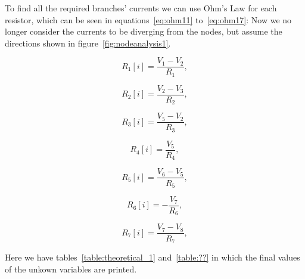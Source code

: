 To find all the required branches' currents we can use Ohm's Law for each resistor, which can be seen in equations~\ref{eq:ohm11} to~\ref{eq:ohm17}: Now we no longer consider the currents to be diverging from the nodes, but assume the directions shown in figure~\ref{fig:nodeanalysis1}.


\begin{equation}
  R_1[i] = \frac{V_1 - V_2}{R_1},
  \label{eq:ohm11}
\end{equation}

\begin{equation}
  R_2[i] = \frac{V_2 - V_3}{R_2},
  \label{eq:ohm12}
\end{equation}

\begin{equation}
  R_3[i] = \frac{V_5 - V_2}{R_3},
  \label{eq:ohm13}
\end{equation}

\begin{equation}
  R_4[i] = \frac{V_5}{R_4},
  \label{eq:ohm14}
\end{equation}

\begin{equation}
  R_5[i] = \frac{V_6 - V_5}{R_5},
  \label{eq:ohm15}
\end{equation}

\begin{equation}
  R_6[i] = -\frac{V_7}{R_6},
  \label{eq:ohm16}
\end{equation}

\begin{equation}
  R_7[i] = \frac{V_7 - V_8}{R_7},
  \label{eq:ohm17}
\end{equation}

Here we have tables~\ref{table:theoretical_1} and~\ref{table:??} in which the final values of the unkown variables are printed. 


